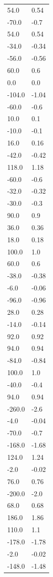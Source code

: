\begin{longtable}{ll}
54.0 & 0.54 \\
-70.0 & -0.7 \\
54.0 & 0.54 \\
-34.0 & -0.34 \\
-56.0 & -0.56 \\
60.0 & 0.6 \\
0.0 & 0.0 \\
-104.0 & -1.04 \\
-60.0 & -0.6 \\
10.0 & 0.1 \\
-10.0 & -0.1 \\
16.0 & 0.16 \\
-42.0 & -0.42 \\
118.0 & 1.18 \\
-60.0 & -0.6 \\
-32.0 & -0.32 \\
-30.0 & -0.3 \\
90.0 & 0.9 \\
36.0 & 0.36 \\
18.0 & 0.18 \\
100.0 & 1.0 \\
60.0 & 0.6 \\
-38.0 & -0.38 \\
-6.0 & -0.06 \\
-96.0 & -0.96 \\
28.0 & 0.28 \\
-14.0 & -0.14 \\
92.0 & 0.92 \\
94.0 & 0.94 \\
-84.0 & -0.84 \\
100.0 & 1.0 \\
-40.0 & -0.4 \\
94.0 & 0.94 \\
-260.0 & -2.6 \\
-4.0 & -0.04 \\
-70.0 & -0.7 \\
-168.0 & -1.68 \\
124.0 & 1.24 \\
-2.0 & -0.02 \\
76.0 & 0.76 \\
-200.0 & -2.0 \\
68.0 & 0.68 \\
186.0 & 1.86 \\
110.0 & 1.1 \\
-178.0 & -1.78 \\
-2.0 & -0.02 \\
-148.0 & -1.48 \\

\end{longtable}
